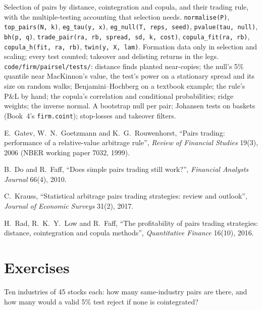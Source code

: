 \begin{build}
 Selection of pairs by distance, cointegration and copula, and their trading rule, with the multiple-testing accounting that selection needs.
 \texttt{normalise(P)}, \texttt{top\_pairs(N, k)}, \texttt{eg\_tau(y, x)}, \texttt{eg\_null(T, reps, seed)}, \texttt{pvalue(tau, null)},
\texttt{bh(p, q)}, \texttt{trade\_pair(ra, rb, spread, sd, k, cost)}, \texttt{copula\_fit(ra, rb)}, \texttt{copula\_h(fit, ra, rb)}, \texttt{twin(y, X, lam)}.
 Formation data only in selection and scaling; every test counted; takeover and delisting returns in the legs.
 \texttt{code/firm/pairsel/tests/}: distance finds planted near-copies; the null's 5\% quantile near MacKinnon's value, the test's power
on a stationary spread and its size on random walks; Benjamini--Hochberg on a textbook example; the rule's P\&L by hand; the copula's correlation and
conditional probabilities; ridge weights; the inverse normal.
 A bootstrap null per pair; Johansen tests on baskets (Book~4's \texttt{firm.coint}); stop-losses and takeover filters.
\end{build}

\begin{omsources}
\item E.~Gatev, W.~N.~Goetzmann and K.~G.~Rouwenhorst, ``Pairs trading: performance of a relative-value arbitrage rule'', \emph{Review of Financial Studies}
19(3), 2006 (NBER working paper 7032, 1999).
\item B.~Do and R.~Faff, ``Does simple pairs trading still work?'', \emph{Financial Analysts Journal} 66(4), 2010.
\item C.~Krauss, ``Statistical arbitrage pairs trading strategies: review and outlook'', \emph{Journal of Economic Surveys} 31(2), 2017.
\item H.~Rad, R.~K.~Y.~Low and R.~Faff, ``The profitability of pairs trading strategies: distance, cointegration and copula methods'', \emph{Quantitative
Finance} 16(10), 2016.
\end{omsources}

\section{Exercises}

\begin{exercise}[$\star$]\label{exo:s1:pairs-and-baskets:1}
Ten industries of 45 stocks each: how many same-industry pairs are there, and how many would a valid 5\% test reject if none is cointegrated?
\end{exercise}

